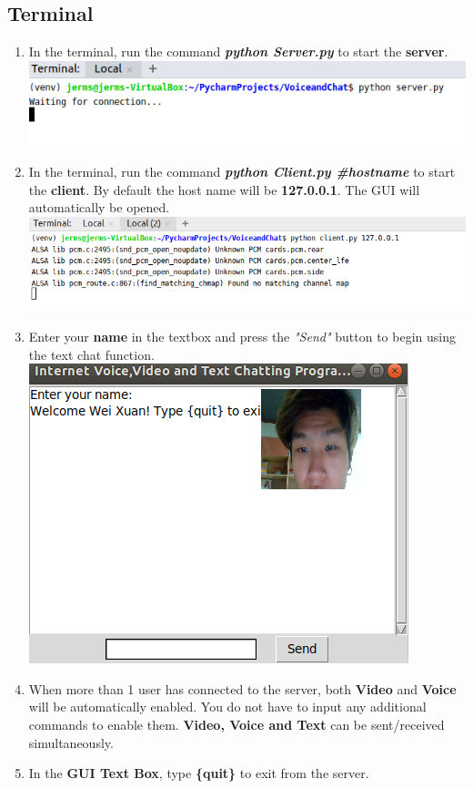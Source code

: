 \documentclass[a4paper,11pt]{article}
\begin{document}
\subsection{Terminal}
\begin{enumerate}
  \item In the terminal, run the command \textbf{\textit{python Server.py}} to start the \textbf{server}.
  \newline
  \includegraphics{server}
  \item In the terminal, run the command \textbf{\textit{python Client.py \#hostname }}to start the \textbf{client}. By default the host name will be \textbf{127.0.0.1}. The GUI will automatically be opened.
  \newline
  \includegraphics{client}
  \item Enter your \textbf{name} in the textbox and press the \textit{"Send"} button to begin using the text chat function.
  \newline
  \includegraphics{name}
   \item When more than 1 user has connected to the server, both \textbf{Video} and \textbf{Voice} will be automatically enabled. You do not have to input any additional commands to enable them. \textbf{Video, Voice and Text} can be sent/received simultaneously.
  \newline 
  \item In the \textbf{GUI Text Box}, type \textbf{\{quit\}} to exit from the server.
   \newline
\end{enumerate}
\end{document}
